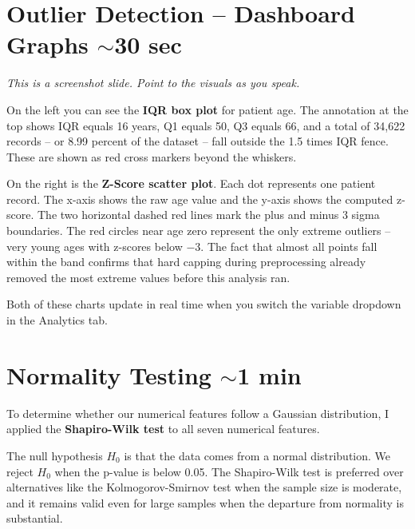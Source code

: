 \documentclass[12pt, letterpaper]{article}
\begin{document}
\section{Outlier Detection -- Dashboard Graphs \hfill \textcolor{slidenumber}{\small $\sim$30 sec}}

\begin{notebox}
\textit{This is a screenshot slide. Point to the visuals as you speak.}
\end{notebox}

On the left you can see the \textbf{IQR box plot} for patient age. The
annotation at the top shows IQR equals 16 years, Q1 equals 50, Q3 equals 66,
and a total of 34,622 records -- or 8.99 percent of the dataset -- fall outside
the 1.5 times IQR fence. These are shown as red cross markers beyond the
whiskers.

On the right is the \textbf{Z-Score scatter plot}. Each dot represents one
patient record. The x-axis shows the raw age value and the y-axis shows the
computed z-score. The two horizontal dashed red lines mark the plus and minus 3
sigma boundaries. The red circles near age zero represent the only extreme
outliers -- very young ages with z-scores below $-3$. The fact that almost all
points fall within the band confirms that hard capping during preprocessing
already removed the most extreme values before this analysis ran.

Both of these charts update in real time when you switch the variable dropdown
in the Analytics tab.

\section{Normality Testing \hfill \textcolor{slidenumber}{\small $\sim$1 min}}

To determine whether our numerical features follow a Gaussian distribution, I
applied the \textbf{Shapiro-Wilk test} to all seven numerical features.

The null hypothesis $H_0$ is that the data comes from a normal distribution.
We reject $H_0$ when the p-value is below 0.05. The Shapiro-Wilk test is
preferred over alternatives like the Kolmogorov-Smirnov test when the sample
size is moderate, and it remains valid even for large samples when the departure
from normality is substantial.
\end{document}
